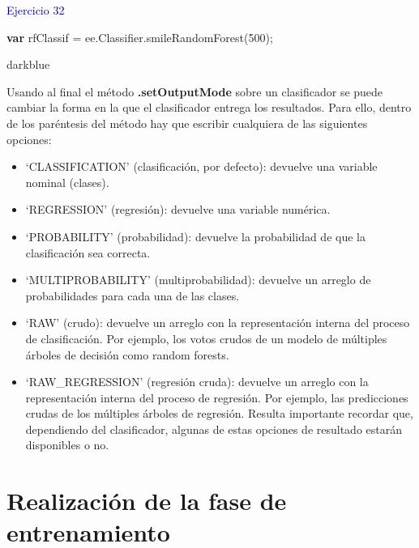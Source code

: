 \documentclass[
  12pt,
  letterpaper,
  twoside]{book}
\newenvironment{Shaded}{\begin{snugshade}}{\end{snugshade}}
\newcommand{\AttributeTok}[1]{\textcolor[rgb]{0.48,0.12,0.64}{#1}}
\newcommand{\DecValTok}[1]{\textcolor[rgb]{0.28,0.53,0.93}{#1}}
\newcommand{\FunctionTok}[1]{\textcolor[rgb]{0.48,0.12,0.64}{#1}}
\newcommand{\KeywordTok}[1]{\textcolor[rgb]{0.00,0.00,0.00}{\textbf{#1}}}
\newcommand{\NormalTok}[1]{#1}
\newcommand{\OperatorTok}[1]{\textcolor[rgb]{0.00,0.00,0.00}{#1}}
\providecommand{\tightlist}{%
  \setlength{\itemsep}{0pt}\setlength{\parskip}{0pt}}
\newcommand\boldpurple[1]{\textcolor{darkpurple}{\textbf{#1}}}
\begin{document}
\textcolor{darkblue}{Ejercicio 32}

\begin{Shaded}
\begin{Highlighting}[]
\KeywordTok{var}\NormalTok{ rfClassif }\OperatorTok{=}\NormalTok{ ee}\OperatorTok{.}\AttributeTok{Classifier}\OperatorTok{.}\FunctionTok{smileRandomForest}\NormalTok{(}\DecValTok{500}\NormalTok{)}\OperatorTok{;}
\end{Highlighting}
\end{Shaded}

\begin{bluebox2}

\begin{awesomeblock}{5pt}{\faLightbulb}{darkblue}

Usando al final el método \boldpurple{.setOutputMode} sobre un clasificador se puede cambiar la forma en la que el clasificador entrega los resultados. Para ello, dentro de los paréntesis del método hay que escribir cualquiera de las siguientes opciones:

\begin{itemize}
\tightlist
\item
  `CLASSIFICATION' (clasificación, por defecto): devuelve una variable nominal (clases).
\item
  `REGRESSION' (regresión): devuelve una variable numérica.
\item
  `PROBABILITY' (probabilidad): devuelve la probabilidad de que la clasificación sea correcta.
\item
  `MULTIPROBABILITY' (multiprobabilidad): devuelve un arreglo de probabilidades para cada una de las clases.
\item
  `RAW' (crudo): devuelve un arreglo con la representación interna del proceso de clasificación. Por ejemplo, los votos crudos de un modelo de múltiples árboles de decisión como random forests.
\item
  `RAW\_REGRESSION' (regresión cruda): devuelve un arreglo con la representación interna del proceso de regresión. Por ejemplo, las predicciones crudas de los múltiples árboles de regresión.
  Resulta importante recordar que, dependiendo del clasificador, algunas de estas opciones de resultado estarán disponibles o no.
\end{itemize}

\end{awesomeblock}

\end{bluebox2}

\hypertarget{realizaciuxf3n-de-la-fase-de-entrenamiento}{%
\section{Realización de la fase de entrenamiento}\label{realizaciuxf3n-de-la-fase-de-entrenamiento}}
\end{document}
